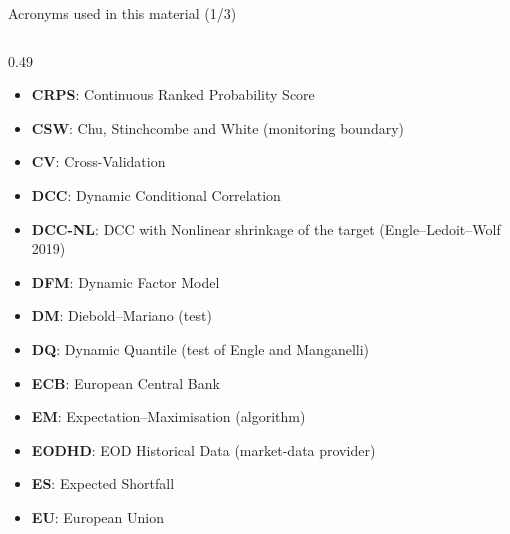 \begin{frame}{Acronyms used in this material (1/3)}
\begin{columns}[T]
\begin{column}{0.49\textwidth}
\begin{itemize}
    \item \textbf{CRPS}: Continuous Ranked Probability Score
    \item \textbf{CSW}: Chu, Stinchcombe and White (monitoring boundary)
    \item \textbf{CV}: Cross-Validation
    \item \textbf{DCC}: Dynamic Conditional Correlation
    \item \textbf{DCC-NL}: DCC with Nonlinear shrinkage of the target (Engle–Ledoit–Wolf 2019)
    \item \textbf{DFM}: Dynamic Factor Model
    \item \textbf{DM}: Diebold–Mariano (test)
    \item \textbf{DQ}: Dynamic Quantile (test of Engle and Manganelli)
    \item \textbf{ECB}: European Central Bank
    \item \textbf{EM}: Expectation–Maximisation (algorithm)
    \item \textbf{EODHD}: EOD Historical Data (market-data provider)
    \item \textbf{ES}: Expected Shortfall
    \item \textbf{EU}: European Union
\end{itemize}
\end{column}
\end{columns}
\end{frame}
